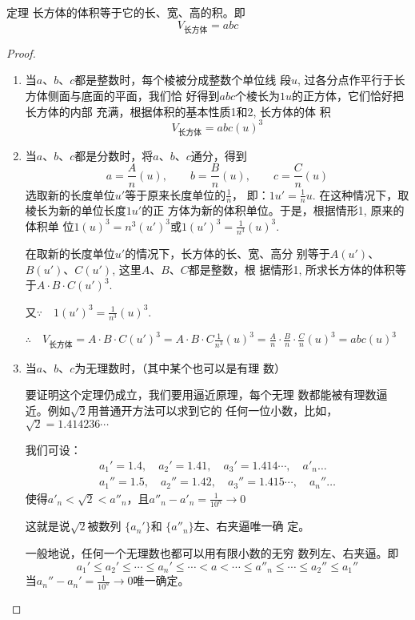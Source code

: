 \begin{blk}
   {定理} 长方体的体积等于它的长、宽、高的积。即
\[V_{\text{长方体}}=abc\] 
\end{blk}

\begin{proof}
\begin{enumerate}
    \item 当$a$、$b$、$c$都是整数时，每个棱被分成整数个单位线
段$u$, 过各分点作平行于长方体侧面与底面的平面，我们恰
好得到$abc$个棱长为$1u$的正方体，它们恰好把长方体的内部
充满，根据体积的基本性质1和2, 长方体的体
积
\[V_{\text{长方体}}=abc(u)^3\]
\item 当$a$、$b$、$c$都是分数时，将$a$、$b$、$c$通分，得到
\[a=\frac{A}{n}(u),\qquad b=\frac{B}{n}(u),\qquad c=\frac{C}{n}(u)\]
选取新的长度单位$u'$等于原来长度单位的$\frac{1}{n}$，
即：$1u'=\frac{1}{n}u$. 
在这种情况下，取棱长为新的单位长度$1u'$的正
方体为新的体积单位。于是，根据情形1, 原来的体积单
位$1(u)^3=n^3(u')^3$或$1(u')^3=\frac{1}{n^3}(u)^3$.

在取新的长度单位$u'$的情况下，长方体的长、宽、高分
别等于$A(u')$、$B(u')$、$C(u')$, 这里$A$、$B$、$C$都是整数，根
据情形1, 所求长方体的体积等于$A\cdot B\cdot C(u')^3$. 

又$\because\quad 1(u')^3=\frac{1}{n^3}(u)^3$. 

$\therefore\quad V_{\text{长方体}}=A\cdot B\cdot C(u')^3
=A\cdot B\cdot C\frac{1}{n^3}(u)^3=\frac{A}{n}\cdot \frac{B}{n}\cdot 
\frac{C}{n}(u)^3=abc(u)^3$

\item 当$a$、$b$、$c$为无理数时，（其中某个也可以是有理
数）

要证明这个定理仍成立，我们要用逼近原理，每个无理
数都能被有理数逼近。例如$\sqrt{2}$用普通开方法可以求到它的
任何一位小数，比如，
$\sqrt{2}=1.414236\cdots$

我们可设：
\[\begin{split}
    a_1'=1.4,\quad a_2'=1.41,\quad a_3'=1.414\cdots,\quad a'_n\ldots\\
a_1''=1.5,\quad a_2''=1.42,\quad a_3''=1.415\cdots,\quad a_n''\ldots
\end{split}\]
使得$a'_n<\sqrt{2}<a''_n$，且$a''_n-a'_n=\frac{1}{10^n}\to 0$

这就是说$\sqrt{2}$被数列 $\{a_n'\}$和 $\{a''_n\}$左、右夹逼唯一确
定。

一般地说，任何一个无理数也都可以用有限小数的无穷
数列左、右夹逼。即
\[a_1'\le a_2'\le \cdots\le a_n'\le \cdots<a<\cdots\le a''_n\le \cdots\le a_2''\le a_1''\]
当$a_n''-a_n'=\frac{1}{10^n}\to 0$唯一确定。


\end{enumerate}
\end{proof}
